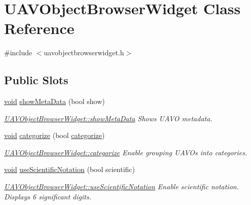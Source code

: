 \hypertarget{class_u_a_v_object_browser_widget}{\section{\-U\-A\-V\-Object\-Browser\-Widget \-Class \-Reference}
\label{class_u_a_v_object_browser_widget}
}


{\ttfamily \#include $<$uavobjectbrowserwidget.\-h$>$}

\subsection*{\-Public \-Slots}
\begin{DoxyCompactItemize}
\item 
\hyperlink{group___u_a_v_objects_plugin_ga444cf2ff3f0ecbe028adce838d373f5c}{void} \hyperlink{group___u_a_v_object_browser_plugin_ga96e35f04d563b34d393bcd810423910d}{show\-Meta\-Data} (bool show)
\begin{DoxyCompactList}\small\item\em \hyperlink{group___u_a_v_object_browser_plugin_ga96e35f04d563b34d393bcd810423910d}{\-U\-A\-V\-Object\-Browser\-Widget\-::show\-Meta\-Data} \-Shows \-U\-A\-V\-O metadata. \end{DoxyCompactList}\item 
\hyperlink{group___u_a_v_objects_plugin_ga444cf2ff3f0ecbe028adce838d373f5c}{void} \hyperlink{group___u_a_v_object_browser_plugin_gaf58df81be827bdbeed97dcb96dcfbb6a}{categorize} (bool \hyperlink{group___u_a_v_object_browser_plugin_gaf58df81be827bdbeed97dcb96dcfbb6a}{categorize})
\begin{DoxyCompactList}\small\item\em \hyperlink{group___u_a_v_object_browser_plugin_gaf58df81be827bdbeed97dcb96dcfbb6a}{\-U\-A\-V\-Object\-Browser\-Widget\-::categorize} \-Enable grouping \-U\-A\-V\-Os into categories. \end{DoxyCompactList}\item 
\hyperlink{group___u_a_v_objects_plugin_ga444cf2ff3f0ecbe028adce838d373f5c}{void} \hyperlink{group___u_a_v_object_browser_plugin_gaf9528641294317e651ef6e23f6e11946}{use\-Scientific\-Notation} (bool scientific)
\begin{DoxyCompactList}\small\item\em \hyperlink{group___u_a_v_object_browser_plugin_gaf9528641294317e651ef6e23f6e11946}{\-U\-A\-V\-Object\-Browser\-Widget\-::use\-Scientific\-Notation} \-Enable scientific notation. \-Displays 6 significant digits. \end{DoxyCompactList}\end{DoxyCompactItemize}
